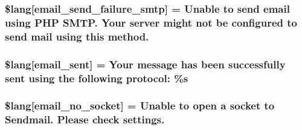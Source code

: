 \subsubsection[{\$lang}]{\setlength{\rightskip}{0pt plus 5cm}\$lang\mbox{[}\textquotesingle{}email\+\_\+send\+\_\+failure\+\_\+smtp\textquotesingle{}\mbox{]} = \textquotesingle{}Unable to send email using P\+H\+P S\+M\+T\+P. Your server might not be configured to send mail using this method.\textquotesingle{}}\label{_admin_2system_2language_2english_2email__lang_8php_a37e19fc7057ba5d5300dd3e83cefc5a2}
\hypertarget{_admin_2system_2language_2english_2email__lang_8php_a7e5c67019fdffb596af1af5a94247ba9}{}
\subsubsection[{\$lang}]{\setlength{\rightskip}{0pt plus 5cm}\$lang\mbox{[}\textquotesingle{}email\+\_\+sent\textquotesingle{}\mbox{]} = \textquotesingle{}Your message has been successfully sent using the following protocol\+: \%s\textquotesingle{}}\label{_admin_2system_2language_2english_2email__lang_8php_a7e5c67019fdffb596af1af5a94247ba9}
\hypertarget{_admin_2system_2language_2english_2email__lang_8php_a78f8be783ca93e91af775994ddc87cb7}{}
\subsubsection[{\$lang}]{\setlength{\rightskip}{0pt plus 5cm}\$lang\mbox{[}\textquotesingle{}email\+\_\+no\+\_\+socket\textquotesingle{}\mbox{]} = \textquotesingle{}Unable to open {\bf a} socket to Sendmail. Please check settings.\textquotesingle{}}\label{_admin_2system_2language_2english_2email__lang_8php_a78f8be783ca93e91af775994ddc87cb7}
\hypertarget{_admin_2system_2language_2english_2email__lang_8php_a03905b414e05a5d3cfd0fe88868615f5}{}
